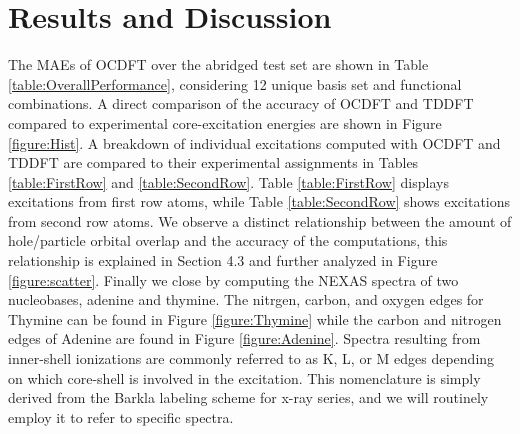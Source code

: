 \documentclass[11.5pt]{article}
\begin{document}
\section{Results and Discussion}
The MAEs of OCDFT over the abridged test set are shown in Table \ref{table:OverallPerformance}, considering 12 unique basis set and functional combinations. A direct comparison of the accuracy of OCDFT and TDDFT compared to experimental core-excitation energies are shown in Figure \ref{figure:Hist}. A breakdown of individual excitations computed with OCDFT and TDDFT are compared to their experimental assignments in Tables \ref{table:FirstRow} and \ref{table:SecondRow}. Table \ref{table:FirstRow} displays excitations from first row atoms, while Table \ref{table:SecondRow} shows excitations from second row atoms. We observe a distinct relationship between the amount of hole/particle orbital overlap and the accuracy of the computations, this relationship is explained in Section 4.3 and further analyzed in Figure \ref{figure:scatter}. Finally we close by computing the NEXAS spectra of two nucleobases, adenine and thymine. The nitrgen, carbon, and oxygen edges for Thymine can be found in Figure \ref{figure:Thymine} while the carbon and nitrogen edges of Adenine are found in Figure \ref{figure:Adenine}. Spectra resulting from inner-shell ionizations are commonly referred to as K, L, or M edges depending on which core-shell is involved in the excitation. This nomenclature is simply derived from the Barkla labeling scheme for x-ray series, and we will routinely employ it to refer to specific spectra.
\end{document}
